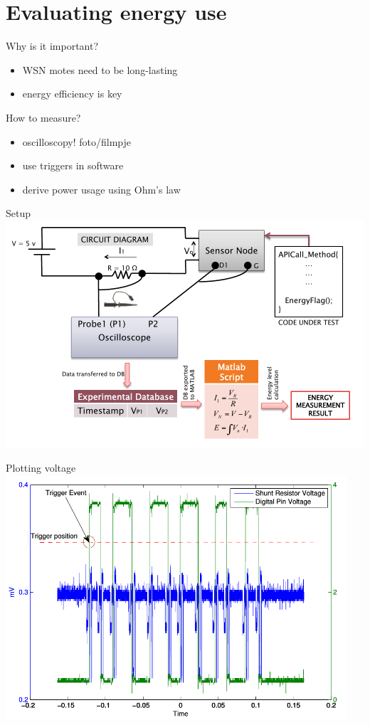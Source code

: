 \documentclass[presentation, bigger]{beamer}
\begin{document}
\section{Evaluating energy use}
\label{sec-3}

\begin{frame}[label=sec-3-1]{Why is it important?}
\begin{itemize}
\item WSN motes need to be long-lasting
\item energy efficiency is key
\end{itemize}
\end{frame}

\begin{frame}[label=sec-3-2]{How to measure?}
\begin{itemize}
\item oscilloscopy!
foto/filmpje
\item use triggers in software
\item derive power usage using Ohm's law
\end{itemize}
\end{frame}

\begin{frame}[label=sec-3-3]{Setup}
\includegraphics[width=\textwidth,keepaspectration=true]{energy_measurement_diagram}
\end{frame}

\begin{frame}[label=sec-3-4]{Plotting voltage}
\includegraphics[width=0.95\textwidth,keepaspectration=true]{energy_measurement_plot}
\end{frame}
\end{document}
